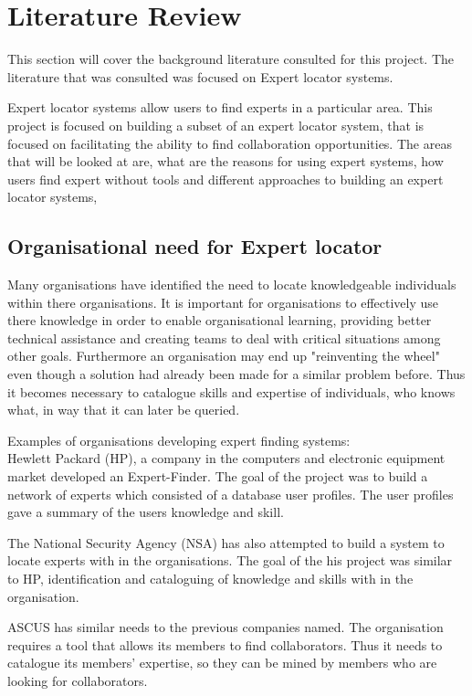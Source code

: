\documentclass[a4paper,oneside,11pt]{report}
\begin{document}
\chapter{Literature Review}
This section will cover the background literature consulted for this project. The literature that was consulted was focused on Expert locator systems. 

Expert locator systems allow users to find experts in a particular area.
This project is focused on building a subset of an expert locator system, that is focused on facilitating the ability to find collaboration opportunities. The areas that will be looked at are, what are the reasons for using expert systems, how users find expert without tools and different approaches to building an expert locator systems,
\section{Organisational need for Expert locator}
Many organisations have identified the need to locate knowledgeable individuals within there organisations. It is important for organisations to effectively use there knowledge in order to enable organisational learning, providing better technical assistance and creating teams to deal with critical situations among other goals\autocite{ackerman2003sharing}. Furthermore an organisation may end up "reinventing the wheel" even though a solution had already been made for a similar problem before. Thus it becomes necessary to catalogue skills and expertise of individuals, who knows what,  in way that it can later be queried\autocite{fernandez2000}.

Examples of organisations developing expert finding systems: \\
Hewlett Packard (HP), a company in the computers and electronic equipment market developed  an Expert-Finder. The goal of the project was to build a network of experts which consisted of a database user profiles. The user profiles gave a summary of the users knowledge and skill\autocite{fernandez2000}.
 
The National Security Agency (NSA) has also attempted to build a system to locate experts with in the organisations. The goal of the his project was similar to HP, identification and cataloguing of knowledge and skills with in the organisation\autocite{fernandez2000}.

ASCUS has similar needs to the previous companies named. The organisation requires a tool that allows its members to find collaborators. Thus it needs to catalogue its members' expertise, so they can be mined by members who are looking for collaborators. 
	
\end{document}
